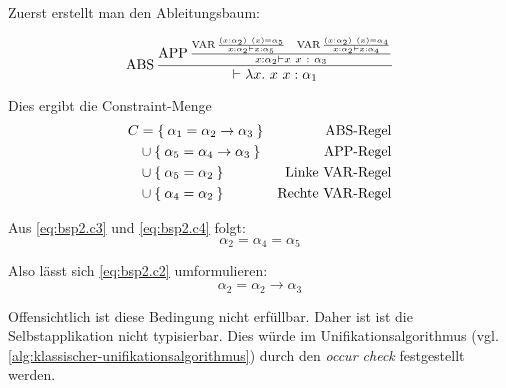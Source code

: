 Zuerst erstellt man den Ableitungsbaum:

\[\ABS\frac{\APP \frac{\VAR \frac{(x:\alpha_2)\ (x) = \alpha_5}{x:\alpha_2 \vdash x: \alpha_5} \;\;\; \VAR \frac{(x:\alpha_2)\ (x) = \alpha_4}{x:\alpha_2 \vdash x:\alpha_4}}{x: \alpha_2 \vdash x\ x\ :\ \alpha_3}}{\vdash \lambda x.\ x\ x: \alpha_1}\]

Dies ergibt die Constraint-Menge
\begin{align}
	C&= \Set{\alpha_1 = \alpha_2 \rightarrow \alpha_3}    &\text{$\operatorname{ABS}$-Regel}\label{eq:bsp2.c1}\\ 
     &\cup \Set{\alpha_5 = \alpha_4 \rightarrow \alpha_3} &\text{$\operatorname{APP}$-Regel}\label{eq:bsp2.c2}\\
     &\cup \Set{\alpha_5 = \alpha_2}                      &\text{Linke $\operatorname{VAR}$-Regel}\label{eq:bsp2.c3}\\
     &\cup \Set{\alpha_4 = \alpha_2}                      &\text{Rechte $\operatorname{VAR}$-Regel}\label{eq:bsp2.c4}
\end{align}

Aus \cref{eq:bsp2.c3} und \cref{eq:bsp2.c4} folgt:
\[\alpha_2 = \alpha_4 = \alpha_5\]

Also lässt sich \cref{eq:bsp2.c2} umformulieren:
\[\alpha_2 = \alpha_2 \rightarrow \alpha_3\]

Offensichtlich ist diese Bedingung nicht erfüllbar. Daher ist ist die Selbstapplikation
nicht typisierbar. Dies würde im Unifikationsalgorithmus 
(vgl. \cref{alg:klassischer-unifikationsalgorithmus})
durch den \textit{occur check} festgestellt werden.